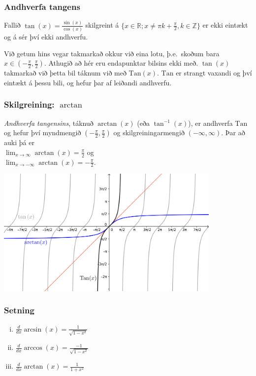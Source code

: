 \documentclass[icelandic,a4paper,12pt]{article}
\newcommand{\Z}{{\mathbb Z}}
\newcommand{\R}{{\mathbb  R}}
\newcommand{\Tan}{{\text{Tan}}}
\begin{document}
\subsubsection{Andhverfa tangens}
Fallið $\tan(x) = \frac{\sin(x)}{\cos(x)}$ skilgreint á 
$\{x \in \R; x \neq \pi k + \frac \pi 2, k \in \Z \}$ er ekki 
eintækt og á sér því ekki andhverfu. 

\pause

Við getum hins vegar takmarkað okkur við eina lotu, þ.e.~skoðum
bara $x\in (-\frac \pi 2, \frac \pi 2)$. \pause Athugið
að hér eru endapunktar bilsins ekki með. \pause $\tan(x)$ takmarkað 
við þetta bil táknum við með $\Tan(x)$. \pause $\Tan$ er strangt 
vaxandi og því eintækt á þessu bili, og hefur þar af leiðandi andhverfu.

\pause

\subsubsection{Skilgreining: $\arctan$}
\emph{Andhverfa tangensins}, táknuð $\arctan(x)$ (eða $\tan^{-1}(x)$), 
er andhverfa $\Tan$ og hefur því myndmengið $(-\frac \pi 2,
\frac \pi 2)$ 
og skilgreiningarmengið $(-\infty,\infty)$. \pause Þar að auki
þá er \\
$\lim_{x\to \infty} \arctan(x) = \frac \pi 2$ og \\
$\lim_{x\to -\infty} \arctan(x) = -\frac \pi 2$.
 
\begin{center}
\includegraphics[width=11cm,keepaspectratio=true]{./myndir/kafli04/05_arctan.png}
\end{center}

\subsubsection{Setning}
\begin{enumerate}[(i)]
\item $\frac d{dx} \arcsin(x) = \frac 1{\sqrt{1-x^2}}$ \pause
\item $\frac d{dx} \arccos(x) = \frac {-1}{\sqrt{1-x^2}}$ \pause
\item $\frac d{dx} \arctan(x) = \frac 1{1+x^2}$ 
\end{enumerate}
\end{document}
